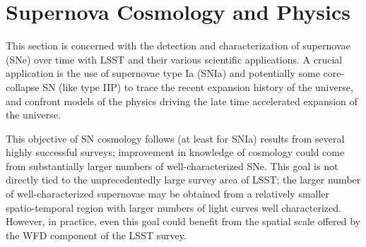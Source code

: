 %
%
%
%
%
%
%
\clearpage
\newpage

\section{Supernova Cosmology and Physics}
\def\secname{supernovae}\label{sec:\secname}



This section is concerned with the detection and characterization of
supernovae (SNe) over time with LSST and their various scientific
applications. A crucial application is the use of supernovae type
Ia (SNIa) and potentially some core-collapse SN (like type IIP) to trace
the recent expansion history of the universe, and confront models of the
physics driving the late time accelerated expansion of the universe.

This objective of SN cosmology follows (at least for SNIa) results from
several highly successful surveys; improvement in knowledge of cosmology
could come from substantially larger numbers of well-characterized SNe.
This goal is not directly tied to the unprecedentedly large survey area of
LSST; the larger number of well-characterized supernovae may be obtained from
a relatively smaller spatio-temporal region with larger numbers of light curves
well characterized. However, in practice, even this goal could
benefit from the spatial scale offered by the WFD component of the LSST
survey. 

